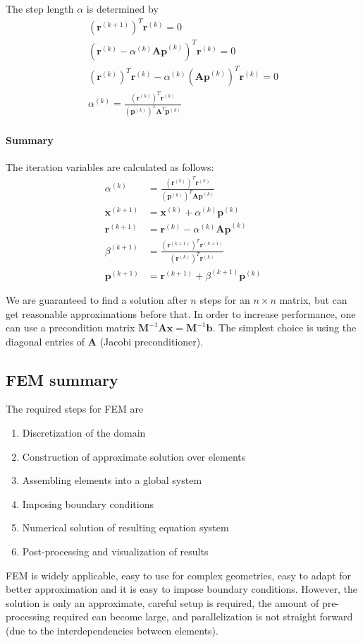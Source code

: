 \documentclass{article}
\begin{document}
The step length $\alpha$ is determined by
\begin{gather}
    (\bm{r}^{(k+1)})^T \bm{r}^{(k)} = 0\\
    (\bm{r}^{(k)} - \alpha^{(k)}\bm{Ap}^{(k)})^T \bm{r}^{(k)} = 0\\
    (\bm{r}^{(k)})^T\bm{r}^{(k)} - \alpha^{(k)} (\bm{Ap}^{(k)})^T \bm{r}^{(k)} = 0\\
    \alpha^{(k)} = \frac{(\bm{r}^{(k)})^T \bm{r}^{(k)}} {(\bm{p}^{(k)})^T \bm{A}^T \bm{p}^{(k)}}
\end{gather}

\paragraph{Summary}
The iteration variables are calculated as follows:
\begin{align}
    \alpha^{(k)} &= \frac{(\bm{r}^{(k)})^T \bm{r}^{(k)}} {(\bm{p}^{(k)})^T \bm{Ap}^{(k)}}\\
    \bm{x}^{(k+1)} &= \bm{x}^{(k)} + \alpha^{(k)} \bm{p}^{(k)}\\
    \bm{r}^{(k+1)} &= \bm{r}^{(k)} - \alpha^{(k)} \bm{Ap}^{(k)}\\
    \beta^{(k+1)} &= \frac{(\bm{r}^{(k+1)})^T \bm{r}^{(k+1)}} {(\bm{r}^{(k)})^T \bm{r}^{(k)}}\\
    \bm{p}^{(k+1)} &= \bm{r}^{(k+1)} + \beta^{(k+1)} \bm{p}^{(k)}
\end{align}

We are guaranteed to find a solution after $n$ steps for an $n \times n$ matrix, but can get reasonable approximations before that.
In order to increase performance, one can use a precondition matrix $\bm{M}^{-1}\bm{Ax} = \bm{M}^{-1}\bm{b}$.
The simplest choice is using the diagonal entries of $\bm{A}$ (Jacobi preconditioner).

\subsection{FEM summary}
The required steps for FEM are
\begin{enumerate}
    \item Discretization of the domain
    \item Construction of approximate solution over elements
    \item Assembling elements into a global system
    \item Imposing boundary conditions
    \item Numerical solution of resulting equation system
    \item Post-processing and visualization of results
\end{enumerate}

FEM is widely applicable, easy to use for complex geometries, easy to adapt for better approximation and it is easy to impose boundary conditions.
However, the solution is only an approximate, careful setup is required, the amount of pre-processing required can become large, and parallelization is not straight forward (due to the interdependencies between elements).
\end{document}
